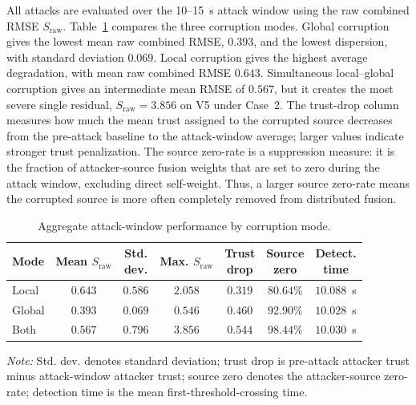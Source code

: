 \documentclass[letterpaper,journal]{IEEEtran}
\begin{document}
All attacks are evaluated over the 10--15~s attack window using the raw combined RMSE $S_{\mathrm{raw}}$. Table~\ref{tab:attack_mode_rmse_summary} compares the three corruption modes. Global corruption gives the lowest mean raw combined RMSE, $0.393$, and the lowest dispersion, with standard deviation $0.069$. Local corruption gives the highest average degradation, with mean raw combined RMSE $0.643$. Simultaneous local--global corruption gives an intermediate mean RMSE of $0.567$, but it creates the most severe single residual, $S_{\mathrm{raw}}=3.856$ on V5 under Case~2. The trust-drop column measures how much the mean trust assigned to the corrupted source decreases from the pre-attack baseline to the attack-window average; larger values indicate stronger trust penalization. The source zero-rate is a suppression measure: it is the fraction of attacker-source fusion weights that are set to zero during the attack window, excluding direct self-weight. Thus, a larger source zero-rate means the corrupted source is more often completely removed from distributed fusion.

\begin{table}[!t]
\centering
\caption{Aggregate attack-window performance by corruption mode.}
\label{tab:attack_mode_rmse_summary}
\footnotesize
\setlength{\tabcolsep}{0pt}
\renewcommand{\arraystretch}{1.22}
\begin{tabular*}{\columnwidth}{@{\extracolsep{\fill}}lcccccc@{}}
\toprule
\textbf{Mode} & \shortstack{\textbf{Mean}\\$S_{\mathrm{raw}}$} & \shortstack{\textbf{Std.}\\\textbf{dev.}} & \shortstack{\textbf{Max.}\\$S_{\mathrm{raw}}$} & \shortstack{\textbf{Trust}\\\textbf{drop}} & \shortstack{\textbf{Source}\\\textbf{zero}} & \shortstack{\textbf{Detect.}\\\textbf{time}} \\
\midrule
Local  & $0.643$ & $0.586$ & $2.058$ & $0.319$ & $80.64\%$ & $10.088$~s \\
Global & $0.393$ & $0.069$ & $0.546$ & $0.460$ & $92.90\%$ & $10.028$~s \\
Both   & $0.567$ & $0.796$ & $3.856$ & $0.544$ & $98.44\%$ & $10.030$~s \\
\bottomrule
\end{tabular*}
\vspace{0.9ex}
\parbox{\columnwidth}{\footnotesize\emph{Note:} Std. dev. denotes standard deviation; trust drop is pre-attack attacker trust minus attack-window attacker trust; source zero denotes the attacker-source zero-rate; detection time is the mean first-threshold-crossing time.}
\end{table}
\end{document}

